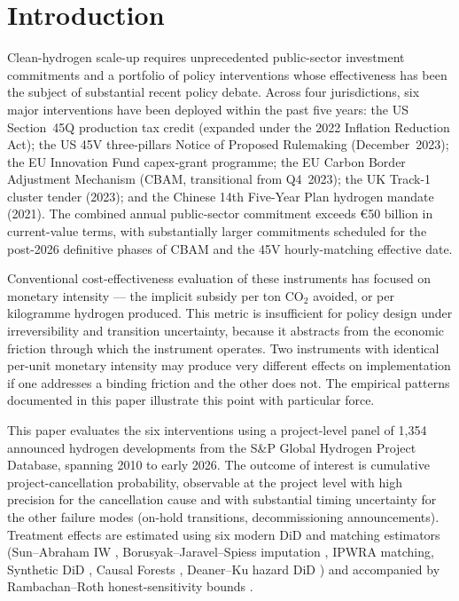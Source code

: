 \documentclass[12pt,a4paper]{article}
\theoremstyle{plain}
\theoremstyle{definition}
\begin{document}
\section{Introduction}
\label{sec:intro}

Clean-hydrogen scale-up requires unprecedented public-sector investment commitments and a portfolio of policy interventions whose effectiveness has been the subject of substantial recent policy debate. Across four jurisdictions, six major interventions have been deployed within the past five years: the US Section~45Q production tax credit (expanded under the 2022 Inflation Reduction Act); the US 45V three-pillars Notice of Proposed Rulemaking (December~2023); the EU Innovation Fund capex-grant programme; the EU Carbon Border Adjustment Mechanism (CBAM, transitional from Q4~2023); the UK Track-1 cluster tender (2023); and the Chinese 14th Five-Year Plan hydrogen mandate (2021). The combined annual public-sector commitment exceeds \euro 50 billion in current-value terms, with substantially larger commitments scheduled for the post-2026 definitive phases of CBAM and the 45V hourly-matching effective date.

Conventional cost-effectiveness evaluation of these instruments has focused on monetary intensity --- the implicit subsidy per ton CO$_2$ avoided, or per kilogramme hydrogen produced. This metric is insufficient for policy design under irreversibility and transition uncertainty, because it abstracts from the economic friction through which the instrument operates. Two instruments with identical per-unit monetary intensity may produce very different effects on implementation if one addresses a binding friction and the other does not. The empirical patterns documented in this paper illustrate this point with particular force.

This paper evaluates the six interventions using a project-level panel of 1{,}354 announced hydrogen developments from the S\&P Global Hydrogen Project Database, spanning 2010 to early 2026. The outcome of interest is cumulative project-cancellation probability, observable at the project level with high precision for the cancellation cause and with substantial timing uncertainty for the other failure modes (on-hold transitions, decommissioning announcements). Treatment effects are estimated using six modern DiD and matching estimators (Sun--Abraham IW \cite{sun2021estimating}, Borusyak--Jaravel--Spiess imputation \cite{borusyak2024revisiting}, IPWRA matching, Synthetic DiD \cite{arkhangelsky2021synthetic}, Causal Forests \cite{athey2019generalized}, Deaner--Ku hazard DiD \cite{deaner2025hazard}) and accompanied by Rambachan--Roth honest-sensitivity bounds \cite{rambachan2023more}.
\end{document}
